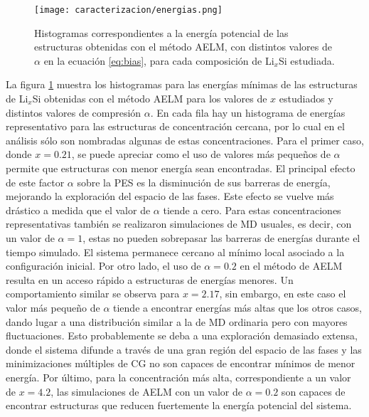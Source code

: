 \begin{figure}[th]
    \centering
    \texttt{[image: caracterizacion/energias.png]}
    \caption{Histogramas correspondientes a la energía potencial de las 
    estructuras obtenidas con el método AELM, con distintos valores de $\alpha$
    en la ecuación \ref{eq:bias}, para cada composición de Li$_x$Si estudiada.}
    \label{fig:energias}
\end{figure}
La figura \ref{fig:energias} muestra los histogramas para las energías mínimas
de las estructuras de Li$_x$Si obtenidas con el método AELM para los valores de
$x$ estudiados y distintos valores de compresión $\alpha$. En cada fila hay un 
histograma de energías representativo para las estructuras de concentración 
cercana, por lo cual en el análisis sólo son nombradas algunas de estas 
concentraciones. Para el primer caso, donde $x = 0.21$, se puede apreciar como el 
uso de valores más pequeños de $\alpha$ permite que estructuras con menor energía 
sean encontradas. El principal efecto de este factor $\alpha$ sobre la PES es la 
disminución de sus barreras de energía, mejorando la exploración del espacio de 
las fases. Este efecto se vuelve más drástico a medida que el valor de $\alpha$ 
tiende a cero. Para estas concentraciones representativas también se realizaron 
simulaciones de MD usuales, es decir, con un valor de $\alpha = 1$, estas no 
pueden sobrepasar las barreras de energías durante el tiempo simulado. El sistema 
permanece cercano al mínimo local asociado a la configuración inicial. Por otro 
lado, el uso de $\alpha = 0.2$ en el método de AELM resulta en un acceso rápido
a estructuras de energías menores. Un comportamiento similar se observa para 
$x = 2.17$, sin embargo, en este caso el valor más pequeño de $\alpha$ tiende a 
encontrar energías más altas que los otros casos, dando lugar a una distribución
similar a la de MD ordinaria pero con mayores fluctuaciones. Esto probablemente 
se deba a una exploración demasiado extensa, donde el sistema difunde a través
de una gran región del espacio de las fases y las minimizaciones múltiples de 
CG no son capaces de encontrar mínimos de menor energía. Por último, para la 
concentración más alta, correspondiente a un valor de $x = 4.2$, las simulaciones 
de AELM con un valor de $\alpha = 0.2$ son capaces de encontrar estructuras que 
reducen fuertemente la energía potencial del sistema. 

